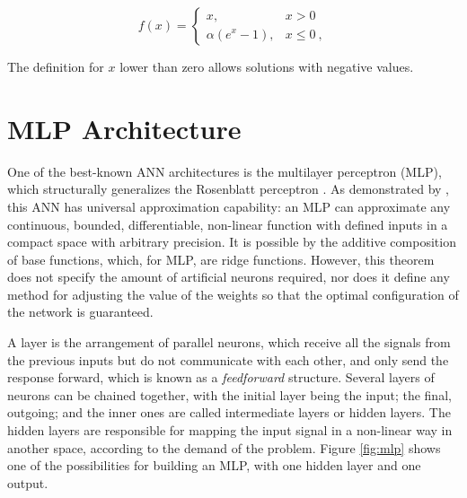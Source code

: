 \documentclass[ruled,graybox]{svmult}
\begin{document}
\begin{equation}
	\label{eq:elu}
	f(x) = \left\{\begin{matrix}
		x,               & x > 0    \\
		\alpha(e^x - 1), & x \leq 0 \:,
	\end{matrix}\right.
\end{equation}

The definition for $x$ lower than zero allows solutions with negative values.


\section{MLP Architecture}
\label{sec:mlp}

One of the best-known ANN architectures is the multilayer perceptron (MLP), which structurally generalizes the Rosenblatt perceptron \cite{Rosenblatt1958}. As demonstrated by \cite{Cybenko1989}, this ANN has universal approximation capability: an MLP can approximate any continuous, bounded, differentiable, non-linear function with defined inputs in a compact space with arbitrary precision. It is possible by the additive composition of base functions, which, for MLP, are ridge functions. However, this theorem does not specify the amount of artificial neurons required, nor does it define any method for adjusting the value of the weights so that the optimal configuration of the network is guaranteed.

A layer is the arrangement of parallel neurons, which receive all the signals from the previous inputs but do not communicate with each other, and only send the response forward, which is known as a \textit{feedforward} structure. Several layers of neurons can be chained together, with the initial layer being the input; the final, outgoing; and the inner ones are called intermediate layers or hidden layers. The hidden layers are responsible for mapping the input signal in a non-linear way in another space, according to the demand of the problem. Figure \ref{fig:mlp} shows one of the possibilities for building an MLP, with one hidden layer and one output.
\end{document}
